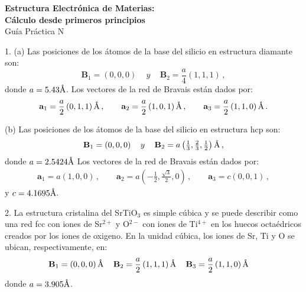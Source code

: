 \documentclass[10pt]{article}
\newcommand{\angstrom}{\text{\normalfont\AA}}
\begin{document}

\begin{center}
 {\large \bf Estructura Electrónica de Materias: \\
 Cálculo desde primeros principios} \\
 
 \vspace{0.25cm}
 Guía Práctica N
\end{center}

\vspace{0.5cm}
1.  (a) Las posiciones de los átomos de la base del silicio en 
estructura diamante son: 
\begin{equation}
 \mathbf{B}_1=(0,0,0)\,\quad y\,\quad \mathbf{B}_2=\frac{a}{4}(1,1,1)\,,
\end{equation}
donde $a=5.43\angstrom$. Los vectores de la red de Bravais están 
dados por:
\begin{align}
 \mathbf{a}_1=\frac{a}{2} \left(0,1,1\right)\angstrom\,,\qquad
 \mathbf{a}_2=\frac{a}{2} \left(1,0,1\right)\angstrom\,,\qquad
 \mathbf{a}_3=\frac{a}{2} \left(1,1,0\right)\angstrom\,.
\end{align}

(b) Las posiciones de los átomos de la base del silicio en 
estructura hcp son: 
\begin{equation}
 \mathbf{B}_1=(0,0,0)\,\quad y\,\quad 
 \mathbf{B}_2=a\left(\tfrac{1}{3},\tfrac{2}{3},\tfrac{1}{2}\right)\angstrom\,,
\end{equation}
donde $a=2.5424\angstrom$
Los vectores de la red de Bravais están dados por:
\begin{align}
 \mathbf{a}_1 = a \left(1,0,0\right)\,,\qquad
 \mathbf{a}_2 = a \left(-\tfrac{1}{2},\tfrac{\sqrt{3}}{2},0\right)\,,\qquad
 \mathbf{a}_3 = c \left(0,0,1\right)\,,
\end{align}
y $c=4.1695\angstrom$.

\vspace{0.5cm}
2. La estructura cristalina del SrTiO$_3$ es simple cúbica y se puede 
describir como una
red fcc con iones de Sr$^{2+}$ y O$^{2-}$ con iones de Ti$^{4+}$ en 
los huecos octaédricos creados por los iones de oxigeno. En la unidad
cúbica, los iones de Sr, Ti y O se ubican, respectivamente, en:
\begin{equation}
 \mathbf{B}_1= \left(0,0,0\right)\angstrom\,\quad
 \mathbf{B}_2= \frac{a}{2}\left(1,1,1\right)\angstrom\,\quad
 \mathbf{B}_3= \frac{a}{2}\left(1,1,0\right)\angstrom\,\quad
\end{equation}
donde $a=3.905\angstrom$.
\end{document}
